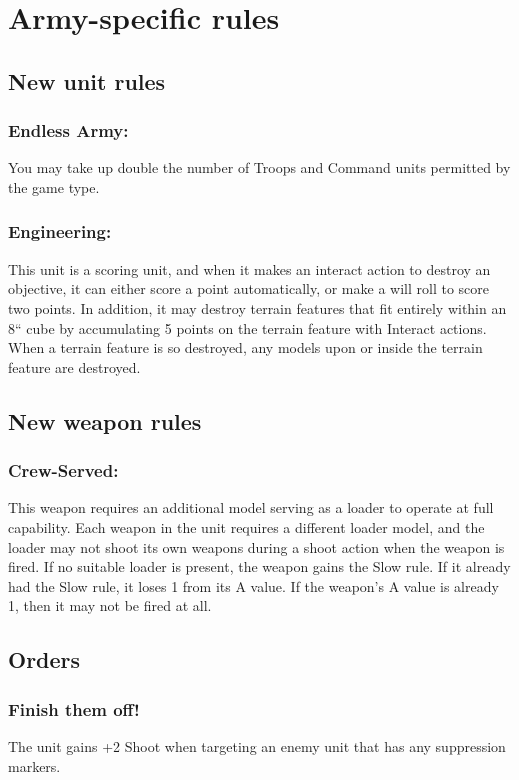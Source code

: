 \section*{Army-specific rules}

\subsection*{New unit rules}

\subsubsection*{Endless Army:} You may take up double the number of Troops and Command units permitted by the game type.

\subsubsection*{Engineering:} This unit is a scoring unit, and when it makes an interact action to destroy an objective, it can either score a point automatically, or make a will roll to score two points. In addition, it may destroy terrain features that fit entirely within an 8`` cube by accumulating 5 points on the terrain feature with Interact actions. When a terrain feature is so destroyed, any models upon or inside the terrain feature are destroyed.

\subsection*{New weapon rules}

\subsubsection*{Crew-Served:} This weapon requires an additional model serving as a loader to operate at full capability. Each weapon in the unit requires a different loader model, and the loader may not shoot its own weapons during a shoot action when the weapon is fired. If no suitable loader is present, the weapon gains the Slow rule. If it already had the Slow rule, it loses 1 from its A value. If the weapon's A value is already 1, then it may not be fired at all.

\subsection*{Orders}

\subsubsection*{Finish them off!} The unit gains +2 Shoot when targeting an enemy unit that has any suppression markers.

